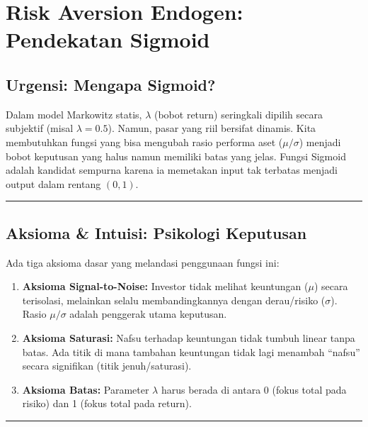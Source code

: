 \section{Risk Aversion Endogen: Pendekatan Sigmoid}\label{appendix-b}

\hypertarget{urgensi-mengapa-sigmoid}{%
\subsection{Urgensi: Mengapa Sigmoid?}\label{urgensi-mengapa-sigmoid}}

Dalam model Markowitz statis, \(\lambda\) (bobot return) seringkali dipilih secara subjektif (misal \(\lambda=0.5\)). Namun, pasar yang riil bersifat dinamis. Kita membutuhkan fungsi yang bisa mengubah rasio performa aset (\(\mu/\sigma\)) menjadi bobot keputusan yang halus namun memiliki batas yang jelas. Fungsi Sigmoid adalah kandidat sempurna karena ia memetakan input tak terbatas menjadi output dalam rentang \((0, 1)\).

\begin{center}\rule{0.5\linewidth}{0.5pt}\end{center}

\hypertarget{aksioma-intuisi-psikologi-keputusan}{%
\subsection{Aksioma \& Intuisi: Psikologi Keputusan}\label{aksioma-intuisi-psikologi-keputusan}}

Ada tiga aksioma dasar yang melandasi penggunaan fungsi ini: 
\begin{enumerate}
  \item \textbf{Aksioma Signal-to-Noise:} Investor tidak melihat keuntungan (\(\mu\)) secara terisolasi, melainkan selalu membandingkannya dengan derau/risiko (\(\sigma\)). Rasio \(\mu/\sigma\) adalah penggerak utama keputusan.
  \item \textbf{Aksioma Saturasi:} Nafsu terhadap keuntungan tidak tumbuh linear tanpa batas. Ada titik di mana tambahan keuntungan tidak lagi menambah ``nafsu'' secara signifikan (titik jenuh/saturasi).
  \item   \textbf{Aksioma Batas:} Parameter \(\lambda\) harus berada di antara 0 (fokus total pada risiko) dan 1 (fokus total pada return).
\end{enumerate}

\begin{center}\rule{0.5\linewidth}{0.5pt}\end{center}

